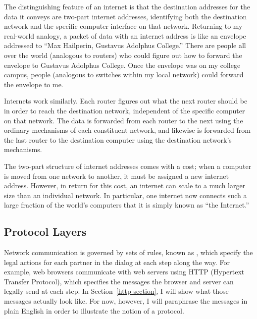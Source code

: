 The distinguishing feature of an internet is that the destination
addresses for the data it conveys are two-part internet addresses,
identifying both the destination network and the specific computer
interface on that network.  Returning to my real-world analogy, a
packet of data with an internet address is like an envelope addressed
to ``Max Hailperin, Gustavus Adolphus College.''  There are people all
over the world (analogous to routers) who could figure out how to
forward the envelope to Gustavus Adolphus College.  Once the envelope
was on my college campus, people (analogous to switches within my local
network) could forward the envelope to me.

Internets work similarly.  Each router figures out what the next
router should be in order to reach the destination network,
independent of the specific computer on that network.  The data is
forwarded from each router to the next using the ordinary mechanisms
of each constituent network, and likewise is forwarded from the last
router to the destination computer using the destination network's
mechanisms.

The two-part structure of internet addresses comes with a cost; when a
computer is moved from one network to another, it
must be assigned a new internet address.  However, in return for this
cost, an internet can scale to a much larger
size than an individual network.  In particular, one internet now
connects such a large fraction of the world's computers that it is
simply known as ``the Internet.''

\subsection{Protocol Layers}\label{protocol-layers-sections}

Network communication is governed by sets of rules, known as
, which specify the legal actions for each partner in
the dialog at each step along the way.  For example, web browsers
communicate with web servers using HTTP (Hypertext Transfer Protocol),
which specifies the messages the browser and server can legally send
at each step.  In Section~\ref{http-section}, I will show what those
messages actually look like.  For now, however, I will paraphrase the
messages in plain English in order to illustrate the notion of a
protocol.

